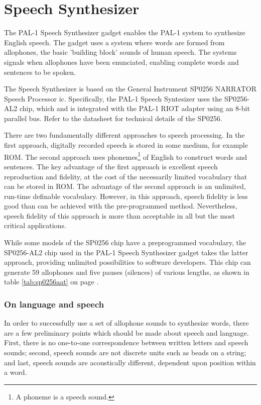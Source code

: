 \chapter{Speech Synthesizer}
\label{ch:speech}


The PAL-1 Speech Synthesizer gadget enables the PAL-1 system to synthesize English speech. The gadget uses a system where words are formed from allophones, the basic 'building block' sounds of human speech. The systems signals when allophones have been enunciated, enabling complete words and sentences to be spoken.

The Speech Synthesizer is based on the General Instrument SP0256 NARRATOR\texttrademark{} Speech Processor \acrshort{ic}. Specifically, the PAL-1 Speech Syntesizer uses the SP0256-AL2 chip, which   and is integrated with the PAL-1 RIOT adapter using an 8-bit parallel bus. Refer to the datasheet for technical details of the SP0256.\cite{gi:SP0256}


There are two fundamentally different approaches to speech processing. In the first approach, digitally recorded speech is stored in some medium, for example ROM. The second approach uses phonemes\footnote{A phoneme is a speech sound.} of English to construct words and sentences. The key advantage of the first approach is excellent speech reproduction and fidelity, at the cost of the necessarily limited vocabulary that can be stored in ROM. The advantage of the second approach is an unlimited, run-time definable vocabulary. However, in this approach, speech fidelity is less good than can be achieved with the pre-programmed method. Nevertheless, speech fidelity of this approach is more than acceptable in all but the most critical applications.

While some models of the SP0256 chip have a preprogrammed vocabulary, the SP0256-AL2 chip used in the  PAL-1 Speech Synthesizer gadget takes the latter approach, providing unlimited possibilities to software developers. This chip can generate 59 allophones and five pauses (silences) of various lengths, as shown in table \ref{tab:sp0256aat} on page \pageref{tab:sp0256aat}.

\subsection*{On language and speech}

In order to successfully use a set of allophone sounds to synthesize words, there are a few preliminary points which should be made about speech and language. First, there is no one-to-one correspondence between written letters and speech sounds; second, speech sounds are not discrete units such as beads on a string; and last, speech sounds are acoustically different, dependent upon position within a word.

